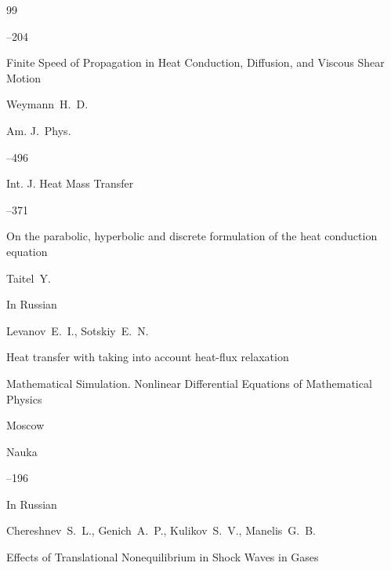 \begin{thebibliography}{99}



--204







\paper Finite Speed of Propagation in Heat Conduction, Diffusion, and Viscous Shear Motion

\by Weymann~H.~D. 

\jour Am.  J.~Phys.



--496






\jour Int. J. Heat Mass Transfer




--371

\paper  On the parabolic, hyperbolic and discrete formulation of the heat conduction equation

\by Taitel~Y. 





\lang In Russian

\by Levanov~E.~I., Sotskiy~E.~N.

\paper Heat transfer with taking into account heat-flux relaxation

\inbook Mathematical Simulation. Nonlinear Differential Equations of Mathematical Physics

\publaddr Moscow

\publ Nauka


--196




\lang In Russian

\by Chereshnev~S.~L., Genich~A.~P., Kulikov~S.~V., Manelis~G.~B.

\preprint  Effects of Translational Nonequilibrium in Shock Waves in Gases


\end{thebibliography}
